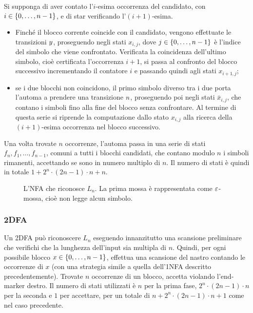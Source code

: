 Si supponga di aver contato l'$i$-esima occorrenza del candidato, con $i\in\left\{ 0,\dots,n-1 \right\}$, e di star verificando l'$(i+1)$-esima.
\begin{itemize}
	\item Finché il blocco corrente coincide con il candidato, vengono effettuate le transizioni $y$, proseguendo negli stati $x_{i,j}$, dove $j\in\left\{ 0,\dots,n-1 \right\}$ è l'indice del simbolo che viene confrontato. Verificata la coincidenza dell'ultimo simbolo, cioè certificata l'occorrenza $i+1$, si passa al confronto del blocco successivo incrementando il contatore $i$ e passando quindi agli stati $x_{i+1,j}$;
	\item se i due blocchi non coincidono, il primo simbolo diverso tra i due porta l'automa a prendere una transizione $n$, proseguendo poi negli stati $\bar x_{i,j}$, che contano i simboli fino alla fine del blocco senza confrontare. Al termine di questa serie si riprende la computazione dallo stato $x_{i,j}$ alla ricerca della $(i+1)$-esima occorrenza nel blocco successivo.
\end{itemize}
Una volta trovate $n$ occorrenze, l'automa passa in una serie di stati $f_n,f_1,\dots,f_{n-1}$, comuni a tutti i blocchi candidati, che contano modulo $n$ i simboli rimanenti, accettando se sono in numero multiplo di $n$. Il numero di stati è quindi in totale $1+2^n\cdot (2n-1)\cdot n+n$.

\begin{figure}
	\centering
	
	\caption{L'NFA che riconosce $L_n$. La prima mossa è rappresentata come $\varepsilon$-mossa, cioè non legge alcun simbolo.}
	\label{img:wit:LnNFA}
\end{figure}

\subsubsection{2DFA}
Un 2DFA può riconoscere $L_n$ eseguendo innanzitutto una scansione preliminare che verifichi che la lunghezza dell'input sia multipla di $n$. Quindi, per ogni possibile blocco $x\in\left\{ 0,\dots,n-1 \right\}$, effettua una scansione del nastro contando le occorrenze di $x$ (con una strategia simile a quella dell'1NFA descritto precedentemente). Trovate $n$ occorrenze di un blocco, accetta violando l'end-marker destro. Il numero di stati utilizzati è $n$ per la prima fase, $2^n\cdot (2n-1)\cdot n$ per la seconda e $1$ per accettare, per un totale di $n+2^n\cdot (2n-1)\cdot n+1$ come nel caso precedente.

